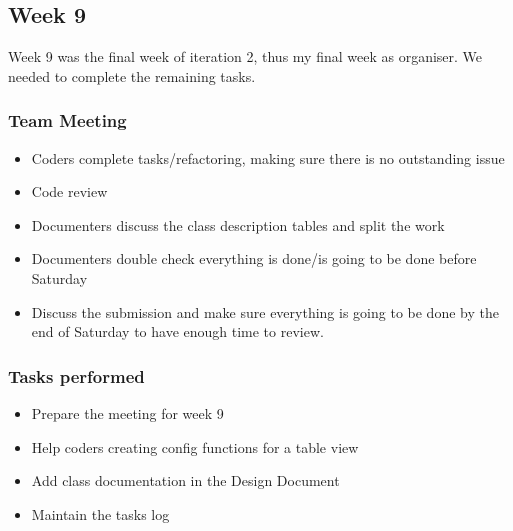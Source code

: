 \documentclass[12pt]{article}
\begin{document}
\subsection{Week 9}
Week 9 was the final week of iteration 2, thus my final week as organiser.
We needed to complete the remaining tasks.

\subsubsection{Team Meeting}
\begin{itemize}
    \item Coders complete tasks/refactoring, making sure there is no outstanding issue
    \item Code review
    \item Documenters discuss the class description tables and split the work
    \item Documenters double check everything is done/is going to be done before Saturday
    \item Discuss the submission and make sure everything is going to be done by the end of Saturday to have enough time to review.
\end{itemize}

\subsubsection{Tasks performed}
\begin{itemize}
    \item Prepare the meeting for week 9
    \item Help coders creating config functions for a table view
    \item Add class documentation in the Design Document
    \item Maintain the tasks log
\end{itemize}
\end{document}
